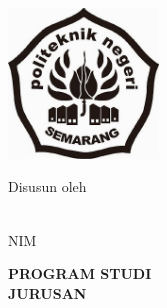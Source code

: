 

\begin{titlepage}
    \centering
    
        \begin{doublespace}
              \textbf{\Large{\MakeUppercase{\judulid}}}\\[2cm]
        \end{doublespace}
    
    \includegraphics[width=0.3\textwidth]{Gambar/POLINES_Logo_2.jpg} %
    
    \vspace*{3cm}
    
    {\Large Disusun oleh \par}
    \vspace{0.5cm}
    
    {\Large \penulis}\\
    \vspace{0.5cm}
    {\Large {NIM} \nim}
    \vspace{2.5cm}
    
    \begin{doublespace}
        \textbf{\Large \MakeUppercase{Program Studi \prodi}}\\
        \textbf{\Large \MakeUppercase{Jurusan \jurusan}}\\
        \textbf{\Large \MakeUppercase{\politeknik}}\\
        \textbf{\Large \MakeUppercase{\the\year{}}}\\
    \end{doublespace}
    

    
   
\end{titlepage}
